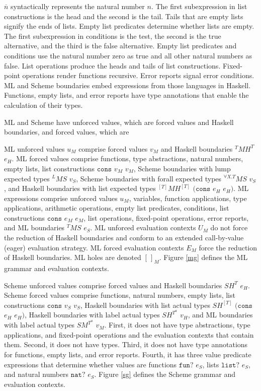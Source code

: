 $\overline{n}$ syntactically represents the natural number $n$.  The first subexpression in list constructions is the head and the second is the tail.  Tails that are empty lists signify the ends of lists.  Empty list predicates determine whether lists are empty.  The first subexpression in conditions is the test, the second is the true alternative, and the third is the false alternative.  Empty list predicates and conditions use the natural number zero as true and all other natural numbers as false.  List operations produce the heads and tails of list constructions.  Fixed-point operations render functions recursive.  Error reports signal error conditions.  ML and Scheme boundaries embed expressions from those languages in Haskell.  Functions, empty lists, and error reports have type annotations that enable the calculation of their types.

ML and Scheme have unforced values, which are forced values and Haskell boundaries, and forced values, which are

ML unforced values $u_{M}$ comprise forced values $v_{M}$ and Haskell boundaries $^{T}MH^{T}$ $e_{H}$.  ML forced values comprise functions, type abstractions, natural numbers, empty lists, list constructions $\mathtt{cons}$ $v_{M}$ $v_{M}$, Scheme boundaries with lump expected types $^{L}MS$ $v_{S}$, Scheme boundaries with forall expected types $^{\forall X.T}MS$ $v_{S}$, and Haskell boundaries with list expected types $^{[T]}MH^{[T]}$ $(\mathtt{cons}$ $e_{H}$ $e_{H})$.  ML expressions comprise unforced values $u_{M}$, variables, function applications, type applications, arithmetic operations, empty list predicates, conditions, list constructions $\mathtt{cons}$ $e_{M}$ $e_{M}$, list operations, fixed-point operations, error reports, and ML boundaries $^{T}MS$ $e_{S}$.  ML unforced evaluation contexts $U_{M}$ do not force the reduction of Haskell boundaries and conform to an extended call-by-value (eager) evaluation strategy.  ML forced evaluation contexts $E_{M}$ force the reduction of Haskell boundaries.  ML holes are denoted $[\,]_{M}$.  Figure \ref{mg} defines the ML grammar and evaluation contexts.

Scheme unforced values comprise forced values and Haskell boundaries $SH^{T}$ $e_{H}$.  Scheme forced values comprise functions, natural numbers, empty lists, list constructions $\mathtt{cons}$ $v_{S}$ $v_{S}$, Haskell boundaries with list actual types $SH^{[T]}$ $(\mathtt{cons}$ $e_{H}$ $e_{H})$, Haskell boundaries with label actual types $SH^{T^{a}}$ $v_{H}$, and ML boundaries with label actual types $SM^{T^{a}}$ $v_{M}$.  First, it does not have type abstractions, type applications, and fixed-point operations and the evaluation contexts that contain them.  Second, it does not have types.  Third, it does not have type annotations for functions, empty lists, and error reports.  Fourth, it has three value predicate expressions that determine whether values are functions $\mathtt{fun?}$ $e_{S}$, lists $\mathtt{list?}$ $e_{S}$, and natural numbers $\mathtt{nat?}$ $e_{S}$.  Figure \ref{sg} defines the Scheme grammar and evaluation contexts.

